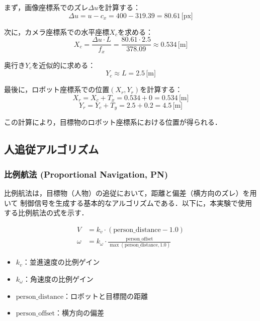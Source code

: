まず，画像座標系でのズレ$\Delta u$を計算する：
\begin{equation}
    \Delta u = u - c_x = 400 - 319.39 = 80.61 \, \text{[px]}
\end{equation}

次に，カメラ座標系での水平座標$X_c$を求める：
\begin{equation}
    X_c = \frac{\Delta u \cdot L}{f_x} = \frac{80.61 \cdot 2.5}{378.09} \approx 0.534 \, \text{[m]}
\end{equation}

奥行き$Y_c$を近似的に求める：
\begin{equation}
    Y_c \approx L = 2.5 \, \text{[m]}
\end{equation}

最後に，ロボット座標系での位置$(X_r, Y_r)$を計算する：
\begin{equation}
    X_r = X_c + T_x = 0.534 +0 = 0.534 \, \text{[m]}
\end{equation}
\begin{equation}
    Y_r = Y_c + T_y = 2.5 + 0.2 = 4.5 \, \text{[m]}
\end{equation}

この計算により，目標物のロボット座標系における位置が得られる．

\subsection{人追従アルゴリズム}

\subsubsection{比例航法 (Proportional Navigation, PN)}
比例航法は，目標物（人物）の追従において，距離と偏差（横方向のズレ）を用いて
制御信号を生成する基本的なアルゴリズムである．以下に，本実験で使用する比例航法の式を示す．

\begin{align}
    V      & = k_v \cdot (\text{person\_distance} - 1.0)                                       \\
    \omega & = k_\omega \cdot \frac{\text{person\_offset}}{\max(\text{person\_distance}, 1.0)}
\end{align}
\begin{itemize}
    \item \(k_v\)：並進速度の比例ゲイン
    \item \(k_\omega\)：角速度の比例ゲイン
    \item \(\text{person\_distance}\)：ロボットと目標間の距離
    \item \(\text{person\_offset}\)：横方向の偏差
\end{itemize}

